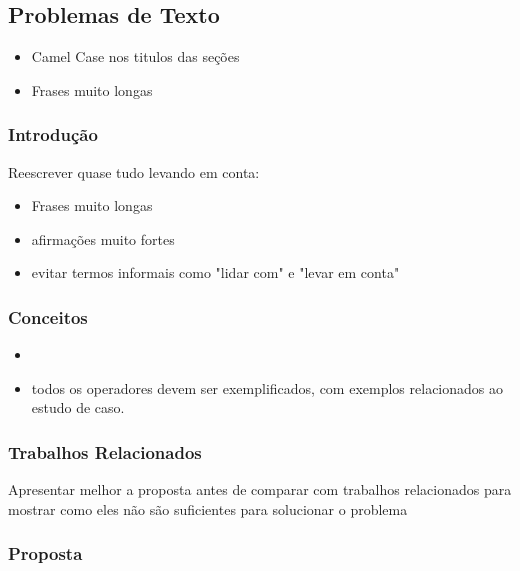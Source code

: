 \subsection{Problemas de Texto}
\begin{itemize}
\item Camel Case nos titulos das seções
\item Frases muito longas
\end{itemize}

\subsubsection{Introdução}
Reescrever quase tudo levando em conta:
\begin{itemize}
\item Frases muito longas
\item afirmações muito fortes
\item evitar termos informais como "lidar com" e "levar em conta"
\end{itemize}
\subsubsection{Conceitos}
\begin{itemize}
\item 
\item todos os operadores devem ser exemplificados, com exemplos relacionados ao estudo de caso.
\end{itemize}



\subsubsection{Trabalhos Relacionados}
Apresentar melhor a proposta antes de comparar com trabalhos relacionados para mostrar como eles não são suficientes para solucionar o problema
\subsubsection{Proposta}

